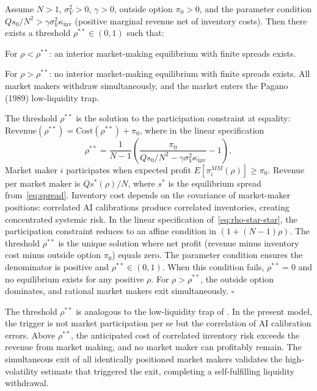 \begin{proposition}\label{prop:rho-star-star}
  Assume $N > 1$, $\sigma_V^2 > 0$, $\gamma > 0$, outside option $\pi_0 > 0$, and the parameter condition $Qs_0/N^2 > \gamma\sigma_V^2\kappa_{\text{inv}}$ (positive marginal revenue net of inventory costs). Then there exists a threshold $\rho^{**} \in (0,1)$ such that:

   For $\rho < \rho^{**}$: an interior market-making equilibrium with finite spreads exists.

   For $\rho > \rho^{**}$: no interior market-making equilibrium with finite spreads exists. All market makers withdraw simultaneously, and the market enters the Pagano (1989) low-liquidity trap.

  The threshold $\rho^{**}$ is the solution to the participation constraint at equality: $\mathrm{Revenue}(\rho^{**}) = \mathrm{Cost}(\rho^{**}) + \pi_0$, where in the linear specification
  \begin{equation}\label{eq:rho-star-star}
    \rho^{**} = \frac{1}{N-1}\left(\frac{\pi_0}{Q s_0/N^2 - \gamma\sigma_V^2\kappa_{\text{inv}}} - 1\right),
  \end{equation}
   Market maker $i$ participates when expected profit $E[\pi_i^{MM}(\rho)] \geq \pi_0$. Revenue per market maker is $Qs^*(\rho)/N$, where $s^*$ is the equilibrium spread from~\eqref{eq:spread}. Inventory cost depends on the covariance of market-maker positions: correlated AI calibrations produce correlated inventories, creating concentrated systemic risk. In the linear specification of~\eqref{eq:rho-star-star}, the participation constraint reduces to an affine condition in $(1+(N-1)\rho)$. The threshold $\rho^{**}$ is the unique solution where net profit (revenue minus inventory cost minus outside option $\pi_0$) equals zero. The parameter condition ensures the denominator is positive and $\rho^{**} \in (0,1)$. When this condition fails, $\rho^{**} = 0$ and no equilibrium exists for any positive $\rho$. For $\rho > \rho^{**}$, the outside option dominates, and rational market makers exit simultaneously. $\square$
\end{proposition}

The threshold $\rho^{**}$ is analogous to the low-liquidity trap of \citet{pagano1989}. In the present model, the trigger is not market participation per se but the correlation of AI calibration errors. Above $\rho^{**}$, the anticipated cost of correlated inventory risk exceeds the revenue from market making, and no market maker can profitably remain. The simultaneous exit of all identically positioned market makers validates the high-volatility estimate that triggered the exit, completing a self-fulfilling liquidity withdrawal.

